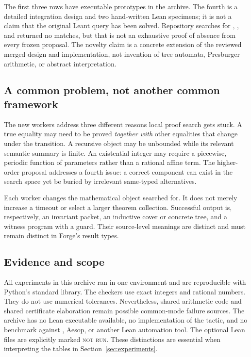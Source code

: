 \documentclass[11pt,a4paper]{article}
\newcommand{\code}[1]{\texttt{\detokenize{#1}}}
\theoremstyle{definition}
\theoremstyle{remark}
\begin{document}
The first three rows have executable prototypes in the archive. The fourth is a
detailed integration design and two hand-written Lean specimens; it is not a
claim that the original Leant query has been solved. Repository searches for
\code{pullback}, \code{automata}, and \code{Cooper} returned no matches, but that
is not an exhaustive proof of absence from every frozen proposal. The novelty
claim is a concrete extension of the reviewed merged design and implementation,
not invention of tree automata, Presburger arithmetic, or abstract interpretation.

\subsection{A common problem, not another common framework}
The new workers address three different reasons local proof search gets stuck.
A true equality may need to be proved \emph{together with} other equalities that
change under the transition. A recursive object may be unbounded while its
relevant semantic summary is finite. An existential integer may require a
piecewise, periodic function of parameters rather than a rational affine term.
The higher-order proposal addresses a fourth issue: a correct component can
exist in the search space yet be buried by irrelevant same-typed alternatives.

Each worker changes the mathematical object searched for. It does not merely
increase a timeout or select a larger theorem collection. Successful output is,
respectively, an invariant packet, an inductive cover or concrete tree, and a
witness program with a guard. Their source-level meanings are distinct and
must remain distinct in Forge's result types.

\subsection{Evidence and scope}
All experiments in this archive ran in one environment and are reproducible
with Python's standard library. The checkers use exact integers and rational
numbers. They do not use numerical tolerances. Nevertheless, shared arithmetic
code and shared certificate elaboration remain possible common-mode failure
sources. The archive has no Lean executable available, no implementation of the
\code{forge} tactic, and no benchmark against \code{grind}, Aesop, or another
Lean automation tool. The optional Lean files are explicitly marked
\textsc{not run}. These distinctions are essential when interpreting the tables
in Section~\ref{sec:experiments}.






\appendix


\end{document}
